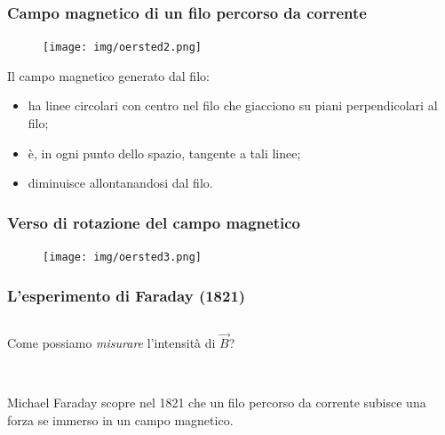 \documentclass[]{beamer}
\theoremstyle{plain}
\begin{document}
\begin{frame}
\frametitle{Campo magnetico di un filo percorso da corrente}
\begin{figure}
\texttt{[image: img/oersted2.png]}
\end{figure}
Il campo magnetico generato dal filo:
\begin{itemize}
  \item ha \alert<1>{linee circolari} con centro nel filo che giacciono su piani perpendicolari al filo;\pause
  \item è, in ogni punto dello spazio, \alert<2>{tangente a tali linee};\pause
  \item \alert<3>{diminuisce allontanandosi} dal filo.
\end{itemize}
\end{frame}



\begin{frame}
\frametitle{Verso di rotazione del campo magnetico}
\begin{figure}
\texttt{[image: img/oersted3.png]}
\end{figure}
\end{frame}




\begin{frame}
\frametitle{L'esperimento di Faraday (1821)}
\begin{columns}
\begin{column}{0.45\textwidth}
Come possiamo \emph<1>{misurare} l'intensità di $ \vec{B} $?\pause

~

Michael Faraday scopre nel 1821 che un filo percorso da corrente \alert<2>{subisce una forza se immerso in un campo magnetico}.\pause
\end{column}
\begin{column}{0.5\textwidth}
\end{column}
\end{columns}
\end{frame}
\end{document}

